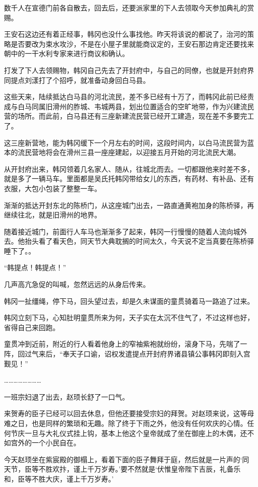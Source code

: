 数千人在宣德门前各自散去，回去后，还要派家里的下人去领取今天参加典礼的赏赐。

王安石这边还有着正经事，韩冈也没什么事找他。昨天将该说的都说了，治河的策略是否要改为束水攻沙，不是在小屋子里就能商议定的，王安石那边肯定还要找来朝中的一干水利专家来进行商议和确认。

打发了下人去领赐物，韩冈自己先去了开封府中，与自己的同僚，也就是开封府界同提点刘漾打了个招呼，就准备动身回白马县。

这些天来，陆续抵达白马县的河北流民，差不多已经有十万了，而韩冈此前已经责成与白马同属旧滑州的胙城、韦城两县，划出位置适合的空旷地带，作为兴建流民营的场所。而此前，白马县还有三座新建流民营已经开工建造，现在差不多要完工了。

这三座新营地，能为韩冈缓下一个月左右的时间，这段时间内，以白马流民营为蓝本的流民营地将会在滑州三县一座座建起，以迎接五月开始的河北流民大潮。

从开封府出来，韩冈领着几名家人、随从，往城北而去。一切都跟他来时差不多，就是多了一辆马车。里面都是吴氏托韩冈带给女儿的东西，有药材、有补品、还有衣服，大包小包装了整整一车。

渐渐的抵达开封东北的陈桥门，从这座城门出去，一路直通黄袍加身的陈桥驿，再继续往北，就是旧滑州的地界。

随着接近城门，前面行人车马也渐渐多了起来，韩冈一行慢慢的随着人流向城外去。他抬头看了看天色，同天节大典耽搁的时间太久，今天说不定当真要在陈桥驿睡下了。。

“韩提点！韩提点！”

几声高亢急促的叫喊，忽然远远的从身后传来。

韩冈一扯缰绳，停下马，回头望过去，却是久未谋面的童贯骑着马一路追了过来。

韩冈立刻下马，心知肚明童贯所来为何，天子实在太沉不住气了，不过这样也好，省得自己来回跑。

童贯冲到近前，附近的行人看着他身上的窄袖紫袍就纷纷，滚身下马，先喘了一阵，回过气来后，“奉天子口谕，诏权发遣提点开封府界诸县镇公事韩冈即刻入宫觐见！”

……………………

一班宗妇退了出去，赵顼长舒了一口气。

来贺寿的臣子已经可以回去休息，但他还要接受宗妇的拜贺。对赵顼来说，这等母难之日，也是同样的繁琐和无趣。除了终于下雨之外，他没有任何欢庆的心情。任何节庆一旦与大礼仪式挂上钩，基本上他这个皇帝就成了坐在御座上的木偶，还不如宫外的一个小民自在。

今天赵顼坐在紫宸殿的御榻上，看着下面的臣子舞拜于庭，然后就是一片声的‘同天节，臣等不胜欢抃，谨上千万岁寿。’要不然就是‘伏惟皇帝陛下吉辰，礼备乐和，臣等不胜大庆，谨上千万岁寿。’


